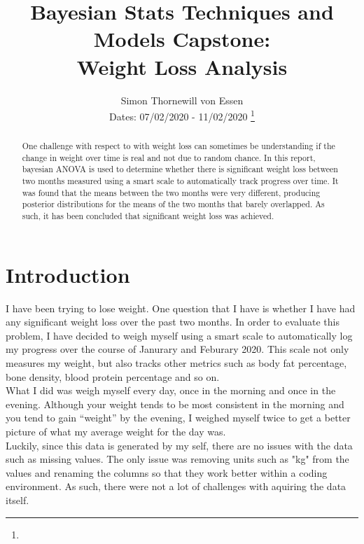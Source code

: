 \documentclass[journal, a4paper]{IEEEtran}
\begin{document}
	\title{Bayesian Stats Techniques and Models Capstone:\\ Weight Loss Analysis}
	\author{Simon Thornewill von Essen\\ Dates: 07/02/2020 - 11/02/2020
	\thanks{}}
	\markboth{}{}
	\maketitle


\begin{abstract}

One challenge with respect to with weight loss can sometimes be understanding if the change in weight over time is real and not due to random chance. In this 
report, bayesian ANOVA is used to determine whether there is significant weight loss between two months measured using a smart scale to automatically track 
progress over time. It was found that the means between the two months were very different, producing posterior distributions for the means of the two months 
that barely overlapped. As such, it has been concluded that  significant weight loss was achieved.

\end{abstract}

\section{Introduction}
 I have been trying to lose weight. One question that I have is whether I have had any significant weight loss over the past two months.
In order to evaluate this problem, I have decided to weigh myself using a smart scale to automatically log my progress over the course of Janurary and Feburary 
2020. This scale not only measures my weight, but also tracks other metrics such as body fat percentage, bone density, blood protein percentage and so on.\\ 

What I did was weigh myself every day, once in the morning and once in the evening. Although your weight tends to be most consistent in the morning and you
tend to gain ``weight'' by the evening, I weighed myself twice to get a better picture of what my average weight for the day was.\\

Luckily, since this data is generated by my self, there are no issues with the data such as missing values. The only issue was removing units such as "kg" from
the values and renaming the columns so that they work better within a coding environment. As such, there were not a lot of challenges with aquiring the data
itself.\\
	
\end{document}

